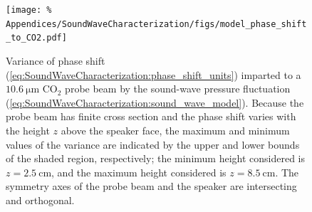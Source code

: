 \begin{figure}
  \centering
  \texttt{[image: \%
    Appendices/SoundWaveCharacterization/figs/model\_phase\_shift\_to\_CO2.pdf]}
  \caption[Variance of phase shift imparted to a CO$_2$ probe beam]{%
    Variance of phase shift
    (\ref{eq:SoundWaveCharacterization:phase_shift_units})
    imparted to a $\SI{10.6}{\micro\meter}$ CO$_2$ probe beam
    by the sound-wave pressure fluctuation
    (\ref{eq:SoundWaveCharacterization:sound_wave_model}).
    Because the probe beam has finite cross section and
    the phase shift varies with the height $z$ above the speaker face,
    the maximum and minimum values of the variance
    are indicated by the upper and lower bounds of the shaded region,
    respectively;
    the minimum height considered is $z = \SI{2.5}{\centi\meter}$, and
    the maximum height considered is $z = \SI{8.5}{\centi\meter}$.
    The symmetry axes of the probe beam and the speaker
    are intersecting and orthogonal.
  }
\label{fig:SoundWaveCharacterization:phase_shift}
\end{figure}




